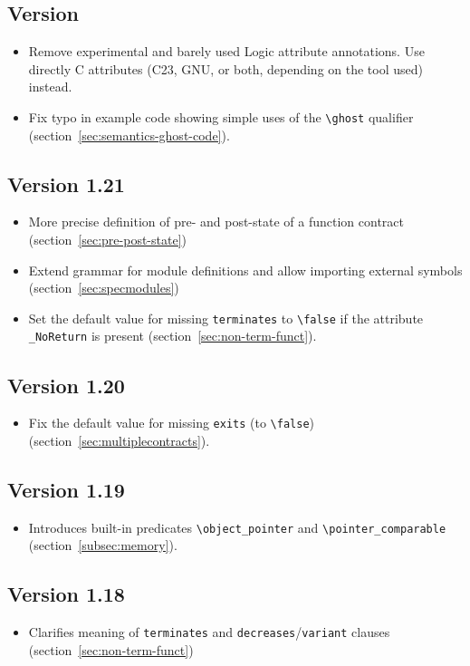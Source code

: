\subsection{Version \version}
\begin{itemize}
\item Remove experimental and barely used Logic attribute annotations.
Use directly C attributes (C23, GNU, or both, depending on the tool used) instead.
\item Fix typo in example code showing simple uses of the \lstinline|\ghost| qualifier (section~\ref{sec:semantics-ghost-code}).
\end{itemize}
\subsection{Version 1.21}
\begin{itemize}
\item More precise definition of pre- and post-state of a function contract
  (section~\ref{sec:pre-post-state})
\item Extend grammar for module definitions and allow importing external symbols
  (section~\ref{sec:specmodules})
\item Set the default value for missing \lstinline|terminates| to
  \lstinline|\false| if the attribute \lstinline|_NoReturn| is present
  (section~\ref{sec:non-term-funct}).
\end{itemize}
\subsection{Version 1.20}
\begin{itemize}
\item Fix the default value for missing \lstinline|exits| (to
\lstinline|\false|) (section~\ref{sec:multiplecontracts}).
\end{itemize}
\subsection{Version 1.19}
\begin{itemize}
\item Introduces built-in predicates \lstinline|\object_pointer| and
\lstinline|\pointer_comparable| (section~\ref{subsec:memory}).
\end{itemize}
\subsection{Version 1.18}
\begin{itemize}
\item Clarifies meaning of \lstinline|terminates| and
  \lstinline|decreases|/\lstinline|variant| clauses (section~\ref{sec:non-term-funct})
\end{itemize}
